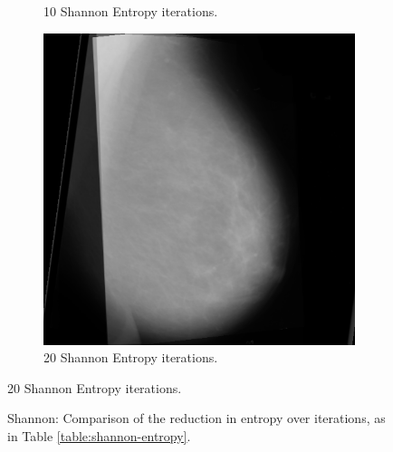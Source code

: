 \begin{figure}[H]
\begin{subfigure}[t]{0.3\textwidth}
        \caption{10 Shannon Entropy iterations.}
        \label{fig:10-shannon}
    \end{subfigure} \hfill
    \begin{subfigure}[t]{0.3\textwidth}
      \includegraphics[width=\textwidth]{Chapter3/shannon-img/shannon-20.png}
      \caption{20 Shannon Entropy iterations.}
      \label{fig:20-shannon}
    \end{subfigure}
\end{figure}

\begin{figure}[H]
  \begin{center}

    \caption{Shannon: Comparison of the reduction in entropy over iterations, as in Table \ref{table:shannon-entropy}.}
  \end{center}
\end{figure}

